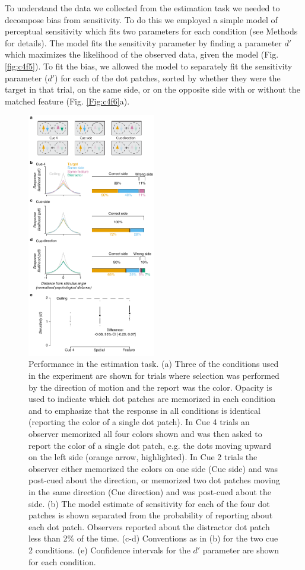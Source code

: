 To understand the data we collected from the estimation task we needed to decompose bias from sensitivity. To do this we employed a simple model of perceptual sensitivity which fits two parameters for each condition (see Methods for details). The model fits the sensitivity parameter by finding a parameter $d'$ which maximizes the likelihood of the observed data, given the model (Fig. \ref{fig:c4f5}). To fit the bias, we allowed the model to separately fit the sensitivity parameter ($d'$) for each of the dot patches, sorted by whether they were the target in that trial, on the same side, or on the opposite side with or without the matched feature (Fig. \ref{Fig:c4f6}a). 

\begin{figure}
\centering
\includegraphics[keepaspectratio,width=0.5\textwidth]{figs_c4/f4b_estimation_perf.pdf}
\caption[Estimation task performance]{Performance in the estimation task. (a) Three of the conditions used in the experiment are shown for trials where selection was performed by the direction of motion and the report was the color. Opacity is used to indicate which dot patches are memorized in each condition and to emphasize that the response in all conditions is identical (reporting the color of a single dot patch). In Cue 4 trials an observer memorized all four colors shown and was then asked to report the color of a single dot patch, e.g. the dots moving upward on the left side (orange arrow, highlighted). In Cue 2 trials the observer either memorized the colors on one side (Cue side) and was post-cued about the direction, or memorized two dot patches moving in the same direction (Cue direction) and was post-cued about the side. (b) The model estimate of sensitivity for each of the four dot patches is shown separated from the probability of reporting about each dot patch. Observers reported about the distractor dot patch less than 2\% of the time. (c-d) Conventions as in (b) for the two cue 2 conditions. (e) Confidence intervals for the $d'$ parameter are shown for each condition.}
\label{fig:c4f6}
\end{figure}


